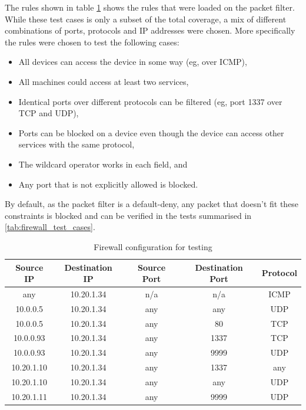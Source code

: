 \newpage

The rules shown in table \ref{tab:firewall_testing_config} shows the rules that were loaded on the packet filter.  While these test cases is only a subset of the total coverage, a mix of different combinations of ports, protocols and IP addresses were chosen. More specifically the rules were chosen to test the following cases:



\begin{itemize}
    \item All devices can access the device in some way (eg, over ICMP),
    \item All machines could access at least two services,
    \item Identical ports over different protocols can be filtered (eg, port 1337 over TCP and UDP),
    \item Ports can be blocked on a device even though the device can access other services with the same protocol,
    \item The wildcard operator works in each field, and
    \item Any port that is not explicitly allowed is blocked.
\end{itemize}

By default, as the packet filter is a default-deny, any packet that doesn't fit these constraints is blocked and can be verified in the tests summarised in \ref{tab:firewall_test_cases}.


\begin{table}[h!]
    \centering
    \caption{Firewall configuration for testing}
    \label{tab:firewall_testing_config}
    \begin{tabular}{ccccc}
        \toprule
        Source IP & Destination IP & Source Port & Destination Port & Protocol \\
        \midrule
        any       & 10.20.1.34      & n/a         & n/a              & ICMP     \\
        10.0.0.5  & 10.20.1.34      & any         & any              & UDP      \\
        10.0.0.5  & 10.20.1.34      & any         & 80               & TCP      \\
        10.0.0.93 & 10.20.1.34      & any         & 1337             & TCP      \\
        10.0.0.93 & 10.20.1.34      & any         & 9999             & UDP      \\
        10.20.1.10& 10.20.1.34      & any         & 1337             & any      \\
        10.20.1.10& 10.20.1.34      & any         & any              & UDP      \\
        10.20.1.11& 10.20.1.34      & any         & 9999             & UDP      \\
        \bottomrule
    \end{tabular}
    
\end{table}

